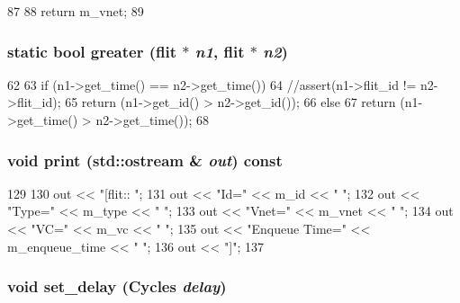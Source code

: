 \begin{DoxyCode}
87 {
88     return m_vnet;
89 }
\end{DoxyCode}
\hypertarget{classflit_a85b6efbd30a8e431411c75dd14c39d56}{
\subsubsection[{greater}]{\setlength{\rightskip}{0pt plus 5cm}static bool greater ({\bf flit} $\ast$ {\em n1}, \/  {\bf flit} $\ast$ {\em n2})}}
\label{classflit_a85b6efbd30a8e431411c75dd14c39d56}



\begin{DoxyCode}
62     {
63         if (n1->get_time() == n2->get_time())
64             //assert(n1->flit_id != n2->flit_id);
65             return (n1->get_id() > n2->get_id());
66         else
67             return (n1->get_time() > n2->get_time());
68     }
\end{DoxyCode}
\hypertarget{classflit_ac55fe386a101fbae38c716067c9966a0}{
\subsubsection[{print}]{\setlength{\rightskip}{0pt plus 5cm}void print (std::ostream \& {\em out}) const}}
\label{classflit_ac55fe386a101fbae38c716067c9966a0}



\begin{DoxyCode}
129 {
130     out << "[flit:: ";
131     out << "Id=" << m_id << " ";
132     out << "Type=" << m_type << " ";
133     out << "Vnet=" << m_vnet << " ";
134     out << "VC=" << m_vc << " ";
135     out << "Enqueue Time=" << m_enqueue_time << " ";
136     out << "]";
137 }
\end{DoxyCode}
\hypertarget{classflit_ab5c471d239a55ffb064ca98eaabcc022}{
\subsubsection[{set\_\-delay}]{\setlength{\rightskip}{0pt plus 5cm}void set\_\-delay ({\bf Cycles} {\em delay})}}
\label{classflit_ab5c471d239a55ffb064ca98eaabcc022}



